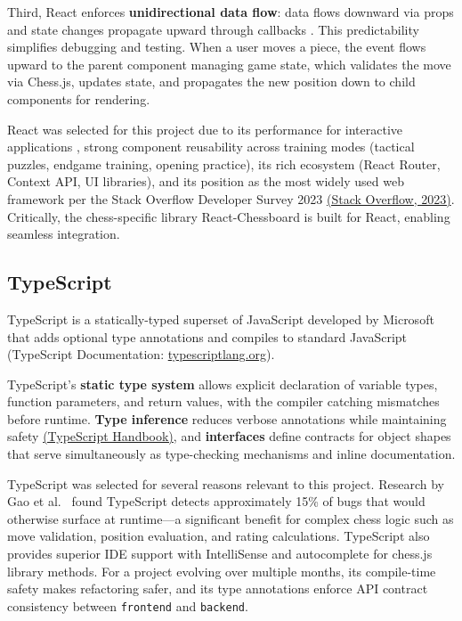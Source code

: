 Third, React enforces \textbf{unidirectional data flow}: data flows downward via props and state changes propagate upward through callbacks \cite{hunt2016react}. This predictability simplifies debugging and testing. When a user moves a piece, the event flows upward to the parent component managing game state, which validates the move via Chess.js, updates state, and propagates the new position down to child components for rendering.

React was selected for this project due to its performance for interactive applications \cite{aggarwal2018modern}, strong component reusability across training modes (tactical puzzles, endgame training, opening practice), its rich ecosystem (React Router, Context API, UI libraries), and its position as the most widely used web framework per the Stack Overflow Developer Survey 2023 \href{https://survey.stackoverflow.co/2023/}{(Stack Overflow, 2023)}. Critically, the chess-specific library React-Chessboard is built for React, enabling seamless integration.

\subsection*{TypeScript}

TypeScript is a statically-typed superset of JavaScript developed by Microsoft that adds optional type annotations and compiles to standard JavaScript \cite{bierman2014typescript} (TypeScript Documentation: \href{https://www.typescriptlang.org/docs/}{typescriptlang.org}).

TypeScript's \textbf{static type system} allows explicit declaration of variable types, function parameters, and return values, with the compiler catching mismatches before runtime. \textbf{Type inference} reduces verbose annotations while maintaining safety \href{https://www.typescriptlang.org/docs/handbook/}{(TypeScript Handbook)}, and \textbf{interfaces} define contracts for object shapes that serve simultaneously as type-checking mechanisms and inline documentation.

TypeScript was selected for several reasons relevant to this project. Research by Gao et al.\ \cite{gao2017type} found TypeScript detects approximately 15\% of bugs that would otherwise surface at runtime---a significant benefit for complex chess logic such as move validation, position evaluation, and rating calculations. TypeScript also provides superior IDE support with IntelliSense and autocomplete for chess.js library methods. For a project evolving over multiple months, its compile-time safety makes refactoring safer, and its type annotations enforce API contract consistency between \texttt{frontend} and \texttt{backend}.

